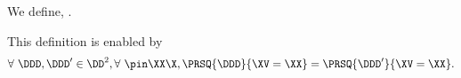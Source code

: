 \begin{definition}
  We define, \probdef.%
\end{definition}

\begin{justification}
  This definition is enabled by 
  $$\forall\ \DDD, \DDD' \in \DD^2, \forall\ \pin\XX\X, \PRSQ{\DDD}{\XV = \XX} 
  = 
  \PRSQ{\DDD'}{\XV = \XX}.$$%
\end{justification}
